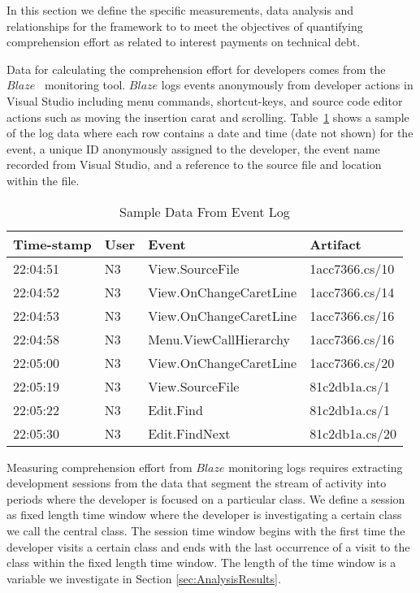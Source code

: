 In this section we define the specific measurements, data analysis and relationships for the framework to to meet the objectives of quantifying comprehension effort as related to interest payments on technical debt.

Data for calculating the comprehension effort for developers comes from the $Blaze$~\cite{Snipes2014Experiences} monitoring tool.  $Blaze$ logs events anonymously from developer actions in Visual Studio including menu commands, shortcut-keys, and source code editor actions such as moving the insertion carat and scrolling.  Table~\ref{fig:SampleEventData} shows a sample of the log data where each row contains a date and time (date not shown) for the event, a unique ID anonymously assigned to the developer, the event name recorded from Visual Studio, and a reference to the source file and location within the file.

\begin{table}
	\centering
	\caption{Sample Data From Event Log}
	\begin{tabular}{|l|l|l|l|}
	\hline

Time-stamp & User & Event & Artifact \\
\hline\hline
22:04:51 & N3 & View.SourceFile & 1acc7366.cs/10 \\
\hline
22:04:52 & N3 & View.OnChangeCaretLine & 1acc7366.cs/14 \\
\hline
22:04:53 & N3 & View.OnChangeCaretLine & 1acc7366.cs/16 \\
\hline
22:04:58 & N3 & Menu.ViewCallHierarchy & 1acc7366.cs/16 \\
\hline
22:05:00 & N3 & View.OnChangeCaretLine & 1acc7366.cs/20 \\
\hline
22:05:19 & N3 & View.SourceFile & 81c2db1a.cs/1 \\
\hline
22:05:22 & N3 & Edit.Find & 81c2db1a.cs/1 \\
\hline
22:05:30 & N3 & Edit.FindNext & 81c2db1a.cs/20 \\
\hline

	\end{tabular}
	\label{fig:SampleEventData}
\end{table}

Measuring comprehension effort from $Blaze$ monitoring logs requires extracting development sessions from the data that segment the stream of activity into periods where the developer is focused on a particular class.  We define a session as fixed length time window where the developer is investigating a certain class we call the central class.  The session time window begins with the first time the developer visits a certain class and ends with the last occurrence of a visit to the class within the fixed length time window.  The length of the time window is a variable we investigate in Section \ref{sec:AnalysisResults}.  

